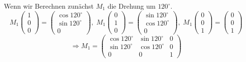 \documentclass[11pt,a4paper,ngerman]{article}
\begin{document}
\begin{enumerate}[\bfseries (a)]
Wenn wir Berechnen zunächst $M_1$ die Drehung um $120^\circ$.\\
$$
M_1 \left( \begin{array}{c} 1 \\ 0 \\ 0 \end{array} \right) = \left( \begin{array}{c} \cos 120^\circ \\ \sin 120^\circ \\ 0 \end{array} \right), \; M_1 \left( \begin{array}{c} 0 \\ 1 \\ 0 \end{array} \right) = \left( \begin{array}{c} \sin 120^\circ \\ \cos 120^\circ \\ 0 \end{array} \right), \; M_1 \left( \begin{array}{c} 0 \\ 0 \\ 1 \end{array} \right) = \left( \begin{array}{c} 0 \\ 0 \\ 1 \end{array} \right)
$$
$$
\Rightarrow M_1 = \left(
\begin{array}{ccc}
\cos 120^\circ & \sin 120^\circ & 0 \\
\sin 120^\circ & \cos 120^\circ & 0 \\
0 & 0 & 1
\end{array} \right)
$$


\end{enumerate}
\end{document}
